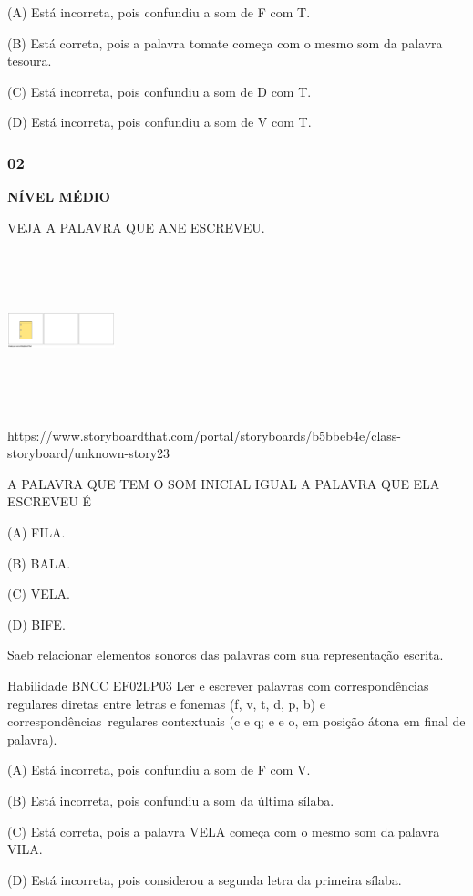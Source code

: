 (A) Está incorreta, pois confundiu a som de F com T.

(B) Está correta, pois a palavra tomate começa com o mesmo som da
palavra tesoura.

(C) Está incorreta, pois confundiu a som de D com T.

(D) Está incorreta, pois confundiu a som de V com T.

\subsubsection{02}\label{section-128}

\textbf{NÍVEL MÉDIO}

VEJA A PALAVRA QUE ANE ESCREVEU.

\includegraphics[width=1.22986in,height=1.82986in]{media/image164.png}

https://www.storyboardthat.com/portal/storyboards/b5bbeb4e/class-storyboard/unknown-story23

A PALAVRA QUE TEM O SOM INICIAL IGUAL A PALAVRA QUE ELA ESCREVEU É

(A) FILA.

(B) BALA.

(C) VELA.

(D) BIFE.

Saeb relacionar elementos sonoros das palavras com sua representação
escrita.

Habilidade BNCC EF02LP03 Ler e escrever palavras com correspondências
regulares diretas entre letras e fonemas (f, v, t, d, p, b) e
correspondências~regulares contextuais (c e q; e e o, em posição átona
em final de palavra).

(A) Está incorreta, pois confundiu a som de F com V.

(B) Está incorreta, pois confundiu a som da última sílaba.

(C) Está correta, pois a palavra VELA começa com o mesmo som da palavra
VILA.

(D) Está incorreta, pois considerou a segunda letra da primeira sílaba.

